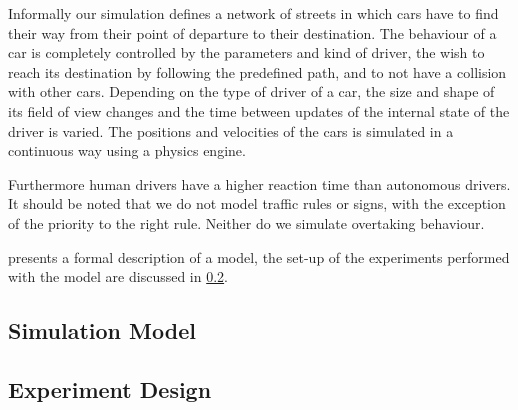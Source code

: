 Informally our simulation defines a network of streets in which cars have to find their way from their point of departure to their destination. The behaviour of a car is completely controlled by the parameters and kind of driver, the wish to reach its destination by following the predefined path, and to not have a collision with other cars. Depending on the type of driver of a car, the size and shape of its field of view changes and the time between updates of the internal state of the driver is varied. The positions and velocities of the cars is simulated in a continuous way using a physics engine. 

Furthermore human drivers have a higher reaction time than autonomous drivers. It should be noted that we do not model traffic rules or signs, with the exception of the priority to the right rule. Neither do we simulate overtaking behaviour.

 presents a formal description of a model, the set-up of the experiments performed with the model are discussed in \cref{sub:method:design}.

\subsection{Simulation Model}
\label{sub:method:model}


\subsection{Experiment Design}
\label{sub:method:design}
